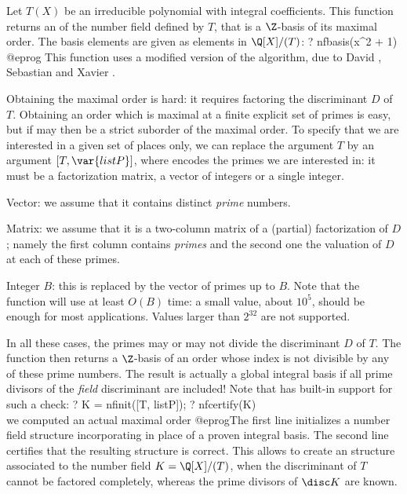 \label{se:nfbasis}
Let $T(X)$ be an irreducible polynomial with integral coefficients. This
function returns an  of the number field defined by $T$,
that is a $\Z$-basis of its maximal order. The basis elements are given as
elements in $\Q[X]/(T)$:
\bprog
? nfbasis(x^2 + 1)
@eprog
This function uses a modified version of the  algorithm,
due to David , Sebastian  and Xavier .


Obtaining the maximal order is hard: it requires factoring the discriminant
$D$ of $T$. Obtaining an order which is maximal at a finite explicit set of
primes is easy, but if may then be a strict suborder of the maximal order. To
specify that we are interested in a given set of places only, we can replace
the argument $T$ by an argument $[T,\var{listP}]$, where  encodes
the primes we are interested in: it must be a factorization matrix, a vector
of integers or a single integer.

\item Vector: we assume that it contains distinct \emph{prime} numbers.

\item Matrix: we assume that it is a two-column matrix of a
(partial) factorization of $D$; namely the first column contains
\emph{primes} and the second one the valuation of $D$ at each of these
primes.

\item Integer $B$: this is replaced by the vector of primes up to $B$. Note
that the function will use at least $O(B)$ time: a small value, about
$10^5$, should be enough for most applications. Values larger than $2^{32}$
are not supported.

In all these cases, the primes may or may not divide the discriminant $D$
of $T$. The function then returns a $\Z$-basis of an order whose index is
not divisible by any of these prime numbers. The result is actually a global
integral basis if all prime divisors of the \emph{field} discriminant are
included! Note that  has built-in support for such
a check:
\bprog
? K = nfinit([T, listP]);
? nfcertify(K)   \\ we computed an actual maximal order
@eprog\noindent The first line initializes a number field structure
incorporating  in place of a proven integral basis.
The second line certifies that the resulting structure is correct. This
allows to create an  structure associated to the number field $K =
\Q[X]/(T)$, when the discriminant of $T$ cannot be factored completely,
whereas the prime divisors of $\disc K$ are known.

